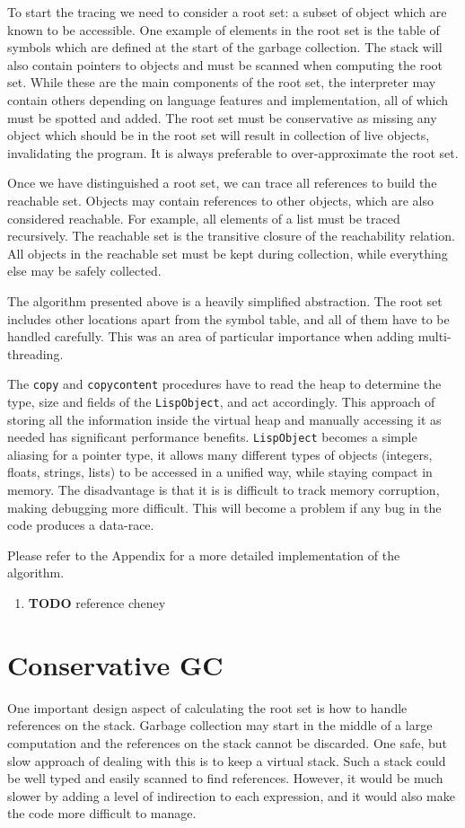 To start the tracing we need to consider a root set: a subset of object which are known to be accessible.
One example of elements in the root set is the table of symbols which are defined at the start
of the garbage collection. The stack will also contain pointers to objects and must be scanned when computing the root set.
While these are the main components of the root set, the interpreter may contain others depending on language features
and implementation, all of which must be spotted and added. The root set must be conservative as missing any object which
should be in the root set will result in collection of live objects, invalidating the program. It is always
preferable to over-approximate the root set.

Once we have distinguished a root set, we can trace all references to build the reachable set. Objects may contain references
to other objects, which are also considered reachable. For example, all elements of a list must be traced recursively.
The reachable set is the transitive closure of the reachability relation. All objects in the reachable set must be kept
during collection, while everything else may be safely collected.

The algorithm presented above is a heavily simplified abstraction. The root set includes other
locations apart from the symbol table, and all of them have to be handled carefully. This was an area
of particular importance when adding multi-threading.

The \texttt{copy} and \texttt{copycontent} procedures have to read the heap to determine the type, size and fields of
the \texttt{LispObject}, and act accordingly. This approach of storing all the information inside the virtual heap
and manually accessing it as needed has significant performance benefits. \texttt{LispObject} becomes a simple aliasing
for a pointer type, it allows many different types of objects (integers, floats, strings, lists) to be accessed
in a unified way, while staying compact in memory. The disadvantage is that it is is difficult to track memory
corruption, making debugging more difficult. This will become a problem if any bug in the code produces a data-race.

Please refer to the Appendix for a more detailed implementation of the algorithm.

\begin{enumerate}
\item {\bfseries\sffamily TODO} reference cheney
\end{enumerate}
\section{Conservative GC}
One important design aspect of calculating the root set is how to handle references on the stack. Garbage collection
may start in the middle of a large computation and the references on the stack cannot be discarded. One safe, but slow
approach of dealing with this is to keep a virtual stack. Such a stack could be well typed and easily scanned to find
references. However, it would be much slower by adding a level of indirection to each expression, and it would also make
the code more difficult to manage.

